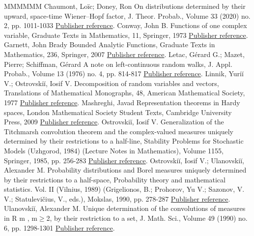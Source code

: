 \documentclass[11pt]{article}
\theoremstyle{definition}
\numberwithin{equation}{section}
\numberwithin{figure}{section}
\numberwithin{table}{section}
\begin{document}
\begin{thebibliography}{MMMMMM}
 Chaumont, Loïc; Doney, Ron On distributions determined by their upward, space-time Wiener–Hopf factor, J. Theor. Probab., Volume 33 (2020) no. 2, pp. 1011-1033 \href{https://ahl.centre-mersenne.org/item/AHL_2020__3__1389_0/#bib:cd17}{Publisher reference}.
 Conway, John B. Functions of one complex variable, Graduate Texts in Mathematics, 11, Springer, 1973 \href{https://ahl.centre-mersenne.org/item/AHL_2020__3__1389_0/#bib:c73}{Publisher reference}.
 Garnett, John Brady Bounded Analytic Functions, Graduate Texts in Mathematics, 236, Springer, 2007 \href{https://ahl.centre-mersenne.org/item/AHL_2020__3__1389_0/#bib:g07}{Publisher reference}.
 Letac, Gérard G.; Mazet, Pierre; Schiffman, Gérard A note on left-continuous random walks, J. Appl. Probab., Volume 13 (1976) no. 4, pp. 814-817 \href{https://ahl.centre-mersenne.org/item/AHL_2020__3__1389_0/#bib:lms76}{Publisher reference}.
 Linnik, Yuriĭ V.; Ostrovskiĭ, Iosif V. Decomposition of random variables and vectors, Translations of Mathematical Monographs, 48, American Mathematical Society, 1977 \href{https://ahl.centre-mersenne.org/item/AHL_2020__3__1389_0/#bib:lo77}{Publisher reference}.
 Mashreghi, Javad Representation theorems in Hardy spaces, London Mathematical Society Student Texts, Cambridge University Press, 2009 \href{https://ahl.centre-mersenne.org/item/AHL_2020__3__1389_0/#bib:m09}{Publisher reference}.
 Ostrovskiĭ, Iosif V. Generalization of the Titchmarsh convolution theorem and the complex-valued measures uniquely determined by their restrictions to a half-line, Stability Problems for Stochastic Models (Uzhgorod, 1984) (Lecture Notes in Mathematics), Volume 1155, Springer, 1985, pp. 256-283 \href{https://ahl.centre-mersenne.org/item/AHL_2020__3__1389_0/#bib:o85}{Publisher reference}.
 Ostrovskiĭ, Iosif V.; Ulanovskiĭ, Alexander M. Probability distributions and Borel measures uniquely determined by their restrictions to a half-space, Probability theory and mathematical statistics. Vol. II (Vilnius, 1989) (Grigelionos, B.; Prohorov, Yu V.; Sazonov, V. V.; Statulevičius, V., eds.), Mokslas, 1990, pp. 278-287 \href{https://ahl.centre-mersenne.org/item/AHL_2020__3__1389_0/#bib:ou90}{Publisher reference}.
 Ulanovskiĭ, Alexander M. Unique determination of the convolutions of measures in R m , m\(\geqslant\)2, by their restriction to a set, J. Math. Sci., Volume 49 (1990) no. 6, pp. 1298-1301 \href{https://ahl.centre-mersenne.org/item/AHL_2020__3__1389_0/#bib:u90}{Publisher reference}.

\end{thebibliography}
\end{document}
